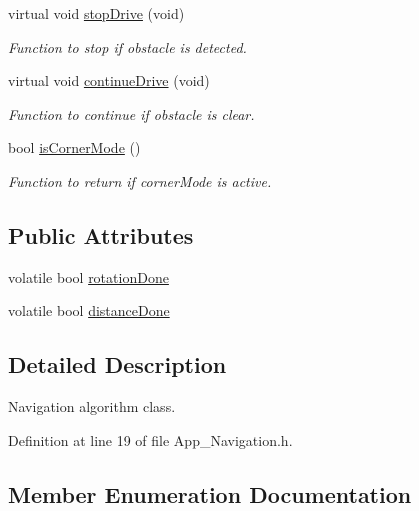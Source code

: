 \begin{DoxyCompactItemize}
virtual void \mbox{\hyperlink{class_c_navigation_a06ce71124d487f1f9febf36a0e4b2a5d}{stop\+Drive}} (void)
\begin{DoxyCompactList}\small\item\em Function to stop if obstacle is detected. \end{DoxyCompactList}\item 
virtual void \mbox{\hyperlink{class_c_navigation_ab3d29f3ab4a8a922f5af439f6d78aded}{continue\+Drive}} (void)
\begin{DoxyCompactList}\small\item\em Function to continue if obstacle is clear. \end{DoxyCompactList}\item 
bool \mbox{\hyperlink{class_c_navigation_aa984fc062deefed13a85d866d997de73}{is\+Corner\+Mode}} ()
\begin{DoxyCompactList}\small\item\em Function to return if corner\+Mode is active. \end{DoxyCompactList}\end{DoxyCompactItemize}
\subsection*{Public Attributes}
\begin{DoxyCompactItemize}
\item 
volatile bool \mbox{\hyperlink{class_c_navigation_a069e02947303fed95655cd4ad88a96b7}{rotation\+Done}}
\item 
volatile bool \mbox{\hyperlink{class_c_navigation_af3f718b7aa00a149c31c5682113da75e}{distance\+Done}}
\end{DoxyCompactItemize}


\subsection{Detailed Description}
Navigation algorithm class. 

Definition at line 19 of file App\+\_\+\+Navigation.\+h.



\subsection{Member Enumeration Documentation}
\mbox{\label{class_c_navigation_add9fc966c7604990edf5c2a2e0eba32c}} 
